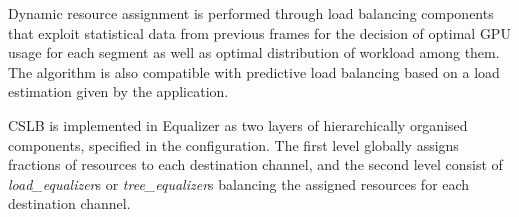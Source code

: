 Dynamic resource assignment is performed through load balancing components that
exploit statistical data from previous frames for the decision of optimal GPU
usage for each segment as well as optimal distribution of workload among them.
The algorithm is also compatible with predictive load balancing based on a load
estimation given by the application.

CSLB is implemented in Equalizer as two layers of hierarchically organised
components, specified in the configuration. The first level globally assigns
fractions of resources to each destination channel, and the second level
consist of {\em load\_equalizer}s or {\em tree\_equalizer}s balancing the
assigned resources for each destination channel.

\begin{figure}[h!t] \center
  \hfill
\end{figure}
